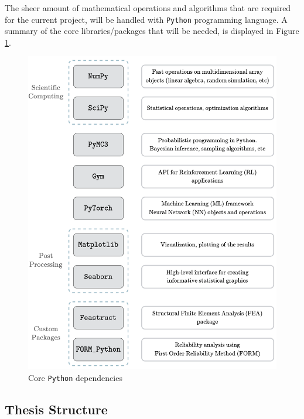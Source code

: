 The sheer amount of mathematical operations and algorithms that are required for the current project, will be handled with \verb|Python| programming language. A summary of the core libraries/packages that will be needed, is displayed in Figure \ref{packs}.

\begin{figure}[H]
    \centering
	\includegraphics[width=0.85\linewidth]{Figures/packages.png}
	\cprotect\caption{Core \verb|Python| dependencies\footnotemark}
	\label{packs}
\end{figure}




\subsection{Thesis Structure} 

